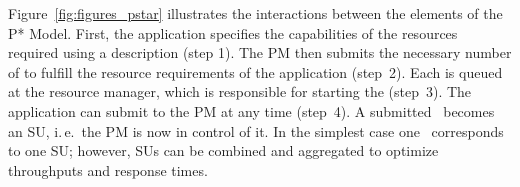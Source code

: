 \documentclass{sig-alternate}
\begin{document}

Figure~\ref{fig:figures_pstar} illustrates the interactions between the
elements of the P* Model. First, the application specifies the capabilities of
the resources required using a \pilotjob description (step 1). The PM then
submits the necessary number of \pilots to fulfill the resource requirements
of the application (step~2). Each \pilot is queued at the resource manager,
which is responsible for starting the \pilot (step~3). The application can
submit \cus to the PM at any time (step~4). A submitted \cu \ becomes an SU,
i.\,e.\ the PM is now in control of it. In the simplest case one \cu \
corresponds to one SU; however, SUs can be combined and aggregated to optimize
throughputs and response times. 
\end{document}
